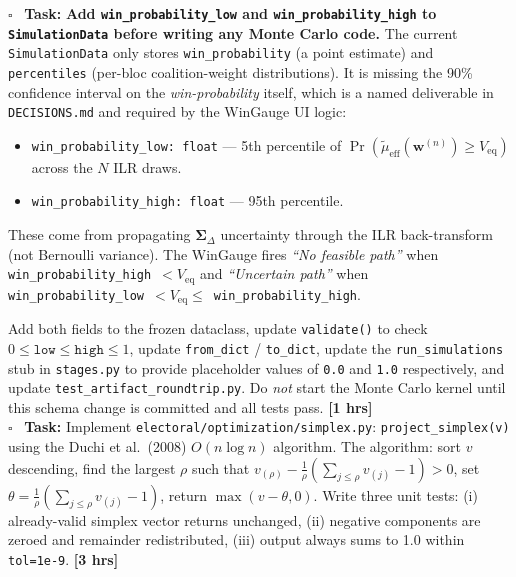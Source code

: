 \documentclass[11pt]{article}
\newcommand{\hrs}[1]{\textbf{[#1 hrs]}}
\newcommand{\veq}{V_{\mathrm{eq}}}
\newcommand{\boldSigma}{\boldsymbol{\Sigma}}
\newcommand{\task}[2]{%
  \noindent\textbf{Task:} #1 \hfill \hrs{#2}\\}
\newcommand{\done}{\textcolor{sectionblue}{$\square$}\ }
\begin{document}
\begin{taskbox}
\done \task{\textbf{Add \texttt{win\_probability\_low} and
  \texttt{win\_probability\_high} to \texttt{SimulationData} before writing
  any Monte Carlo code.}
  The current \texttt{SimulationData} only stores \texttt{win\_probability}
  (a point estimate) and \texttt{percentiles} (per-bloc coalition-weight
  distributions). It is missing the 90\% confidence interval on the
  \emph{win-probability} itself, which is a named deliverable in
  \texttt{DECISIONS.md} and required by the WinGauge UI logic:

  \begin{itemize}[leftmargin=1.6em, itemsep=1pt]
    \item \texttt{win\_probability\_low: float} --- 5th percentile of
          $\Pr(\tilde{\mu}_{\mathrm{eff}}(\mathbf{w}^{(n)}) \geq \veq)$
          across the $N$ ILR draws.
    \item \texttt{win\_probability\_high: float} --- 95th percentile.
  \end{itemize}

  These come from propagating $\boldSigma_\Delta$ uncertainty through the
  ILR back-transform (not Bernoulli variance). The WinGauge fires
  \textit{``No feasible path''} when \texttt{win\_probability\_high}~$< \veq$
  and \textit{``Uncertain path''} when
  \texttt{win\_probability\_low}~$< \veq \leq$~\texttt{win\_probability\_high}.

  Add both fields to the frozen dataclass, update \texttt{validate()} to
  check $0 \leq \texttt{low} \leq \texttt{high} \leq 1$, update
  \texttt{from\_dict} / \texttt{to\_dict}, update the \texttt{run\_simulations}
  stub in \texttt{stages.py} to provide placeholder values of \texttt{0.0}
  and \texttt{1.0} respectively, and update \texttt{test\_artifact\_roundtrip.py}.
  Do \emph{not} start the Monte Carlo kernel until this schema change is
  committed and all tests pass.}{1}

\done \task{Implement \texttt{electoral/optimization/simplex.py}:
  \texttt{project\_simplex(v)} using the Duchi et al.\ (2008) $O(n \log n)$
  algorithm. The algorithm: sort $v$ descending, find the largest $\rho$ such
  that $v_{(\rho)} - \frac{1}{\rho}(\sum_{j \leq \rho} v_{(j)} - 1) > 0$,
  set $\theta = \frac{1}{\rho}(\sum_{j \leq \rho} v_{(j)} - 1)$, return
  $\max(v - \theta, 0)$. Write three unit tests: (i) already-valid simplex
  vector returns unchanged, (ii) negative components are zeroed and remainder
  redistributed, (iii) output always sums to 1.0 within \texttt{tol=1e-9}.}{3}


\end{taskbox}
\end{document}
